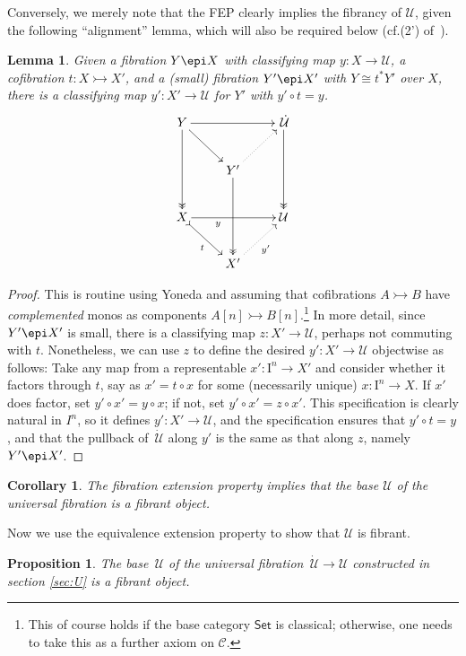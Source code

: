 \documentclass[12pt]{article}
\newcommand{\CC}{\ensuremath{\mathcal{C}}}
\newcommand{\Set}{\ensuremath{\mathsf{Set}}}
\newcommand{\mono}{\ensuremath{\rightarrowtail}}
\newcommand{\ra}{\ensuremath{\rightarrow}}
\newcommand{\cof}{\ensuremath{\rightarrowtail}}
\newcommand{\fib}{\ensuremath{\epi}}
\newcommand{\I}{\ensuremath{\mathrm{I}}}
\newcommand{\U}{\ensuremath{\mathcal{U}}}
\newcommand{\UU}{\ensuremath{\,\dot{\mathcal{U}}}}
\newtheorem{proposition}[theorem]{Proposition}
\newtheorem{lemma}[theorem]{Lemma}
\newtheorem{corollary}[theorem]{Corollary}
\theoremstyle{remark}
\theoremstyle{definition}
\begin{document}
Conversely, we merely note that the FEP clearly implies the fibrancy of $\U$, given the following ``alignment'' lemma, which will also be required below (cf.(2') of~\cite{Shu:UAERP}).

\begin{lemma}\label{lem:alignment}
Given a fibration $Y\epi X$ with classifying map $y : X \ra \U$, a cofibration $t : X\cof X'$, and a (small) fibration $Y'\epi X'$ with $Y \cong t^*Y'$ over $X$, there is a classifying map $y' : X' \ra \U$ for $Y'$ with $y'\circ t = y$.
\[
\xymatrix{
Y \ar@{->>}[dd] \ar[rd] \ar[rr] && \UU \ar@{->>}[dd] \\
& Y' \ar@{->>}[dd] \ar@{..>}[ru] & \\
X  \ar@{>->}[rd]_t \ar[rr]_<<<<<<<<{y}  && \U  \\
& X' \ar@{..>}[ru]_{y'} &
}
\]
\end{lemma}
\begin{proof}
This is routine using Yoneda and assuming that cofibrations $A \mono B$ have \emph{complemented} monos as components $A[n] \mono B[n]$.\footnote{This of course holds if the base category $\Set$ is classical; otherwise, one needs to take this as a further axiom on $\CC$.}  In more detail, since $Y'\epi X'$ is small, there is a classifying map $z : X' \ra \U$,  perhaps not commuting with $t$. Nonetheless, we can use $z$ to define the desired $y' : X' \ra \U$ objectwise as follows: Take any map from a representable $x' : \I^n \ra X'$ and consider whether it factors through $t$, say as $x' = t\circ x$ for some (necessarily unique) $x: \I^n \ra X$.  If $x'$ does factor, set  $y'\circ x' = y\circ x$; if not, set $y'\circ x' = z\circ x'$.  This specification is clearly natural in $I^n$, so it defines $y': X'\ra\U$, and the specification ensures that $y'\circ t = y$, and that the pullback of $\UU$ along $y'$ is the same as that along $z$, namely $Y'\fib X'$.
\end{proof}

\begin{corollary}
The fibration extension property implies that the base $\U$ of the universal fibration is a fibrant object.
\end{corollary}

Now we use the equivalence extension property to show that $\U$ is fibrant.
\begin{proposition}
The base $\,\U$ of the universal fibration $\UU\ra\U$ constructed in section \ref{sec:U} is a fibrant object.
\end{proposition}
\end{document}
